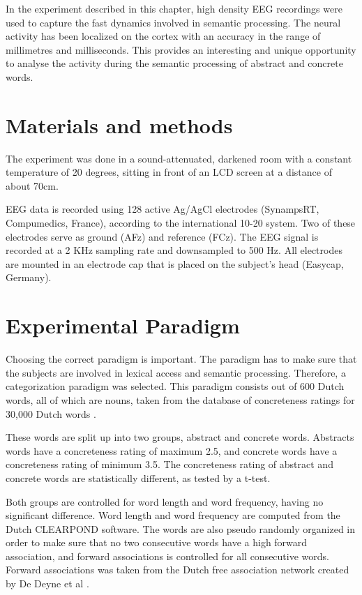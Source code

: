 In the experiment described in this chapter, high density EEG recordings were used to capture the fast dynamics involved in semantic processing. The neural activity has been localized on the cortex with an accuracy in the range of millimetres and milliseconds. This provides an interesting and unique opportunity to analyse the activity during the semantic processing of abstract and concrete words.

\section{Materials and methods}

The experiment was done in a sound-attenuated, darkened room with a constant temperature of 20 degrees, sitting in front of an LCD screen at a distance of about 70cm.

EEG data is recorded using 128 active Ag/AgCl electrodes (SynampsRT, Compumedics, France), according to the international 10-20 system. Two of these electrodes serve as ground (AFz) and reference (FCz). The EEG signal is recorded at a 2 KHz sampling rate and downsampled to 500 Hz. All electrodes are mounted in an electrode cap that is placed on the subject's head (Easycap, Germany). 

\section{Experimental Paradigm}

Choosing the correct paradigm is important. The paradigm has to make sure that the subjects are involved in lexical access and semantic processing. Therefore, a categorization paradigm was selected. This paradigm consists out of 600 Dutch words, all of which are nouns, taken from the database of concreteness ratings for 30,000 Dutch words \cite{brysbaert2014concreteness}.

These words are split up into two groups, abstract and concrete words. Abstracts words have a concreteness rating of maximum 2.5, and concrete words have a concreteness rating of minimum 3.5. The concreteness rating of abstract and concrete words are statistically different, as tested by a t-test.

Both groups are controlled for word length and word frequency, having no significant difference. Word length and word frequency are computed from the Dutch CLEARPOND software. The words are also pseudo randomly organized in order to make sure that no two consecutive words have a high forward association, and forward associations is controlled for all consecutive words. Forward associations was taken from the Dutch free association network created by De Deyne et al \cite{de2008word}. 

